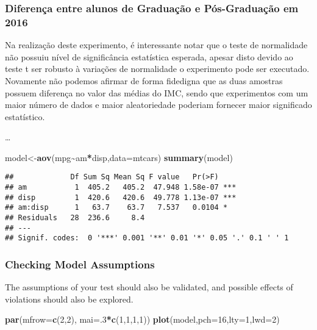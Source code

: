 \documentclass[
]{article}
\newenvironment{Shaded}{\begin{snugshade}}{\end{snugshade}}
\newcommand{\AttributeTok}[1]{\textcolor[rgb]{0.13,0.29,0.53}{#1}}
\newcommand{\DecValTok}[1]{\textcolor[rgb]{0.00,0.00,0.81}{#1}}
\newcommand{\FunctionTok}[1]{\textcolor[rgb]{0.13,0.29,0.53}{\textbf{#1}}}
\newcommand{\NormalTok}[1]{#1}
\newcommand{\OtherTok}[1]{\textcolor[rgb]{0.56,0.35,0.01}{#1}}
\newcommand{\SpecialCharTok}[1]{\textcolor[rgb]{0.81,0.36,0.00}{\textbf{#1}}}
\begin{document}
\subsubsection{Diferença entre alunos de Graduação e Pós-Graduação em
2016}\label{diferenuxe7a-entre-alunos-de-graduauxe7uxe3o-e-puxf3s-graduauxe7uxe3o-em-2016-2}

Na realização deste experimento, é interessante notar que o teste de
normalidade não possuiu nível de significância estatística esperada,
apesar disto devido ao teste t ser robusto à variações de normalidade o
experimento pode ser executado. Novamente não podemos afirmar de forma
fidedigna que as duas amostras possuem diferença no valor das médias do
IMC, sendo que experimentos com um maior número de dados e maior
aleatoriedade poderiam fornecer maior significado estatístico.

\ldots{}

\begin{Shaded}
\begin{Highlighting}[]
\NormalTok{model}\OtherTok{\textless{}{-}}\FunctionTok{aov}\NormalTok{(mpg}\SpecialCharTok{\textasciitilde{}}\NormalTok{am}\SpecialCharTok{*}\NormalTok{disp,}\AttributeTok{data=}\NormalTok{mtcars)}
\FunctionTok{summary}\NormalTok{(model)}
\end{Highlighting}
\end{Shaded}

\begin{verbatim}
##             Df Sum Sq Mean Sq F value   Pr(>F)    
## am           1  405.2   405.2  47.948 1.58e-07 ***
## disp         1  420.6   420.6  49.778 1.13e-07 ***
## am:disp      1   63.7    63.7   7.537   0.0104 *  
## Residuals   28  236.6     8.4                     
## ---
## Signif. codes:  0 '***' 0.001 '**' 0.01 '*' 0.05 '.' 0.1 ' ' 1
\end{verbatim}

\subsubsection{Checking Model
Assumptions}\label{checking-model-assumptions}

The assumptions of your test should also be validated, and possible
effects of violations should also be explored.

\begin{Shaded}
\begin{Highlighting}[]
\FunctionTok{par}\NormalTok{(}\AttributeTok{mfrow=}\FunctionTok{c}\NormalTok{(}\DecValTok{2}\NormalTok{,}\DecValTok{2}\NormalTok{), }\AttributeTok{mai=}\NormalTok{.}\DecValTok{3}\SpecialCharTok{*}\FunctionTok{c}\NormalTok{(}\DecValTok{1}\NormalTok{,}\DecValTok{1}\NormalTok{,}\DecValTok{1}\NormalTok{,}\DecValTok{1}\NormalTok{))}
\FunctionTok{plot}\NormalTok{(model,}\AttributeTok{pch=}\DecValTok{16}\NormalTok{,}\AttributeTok{lty=}\DecValTok{1}\NormalTok{,}\AttributeTok{lwd=}\DecValTok{2}\NormalTok{)}
\end{Highlighting}
\end{Shaded}
\end{document}
